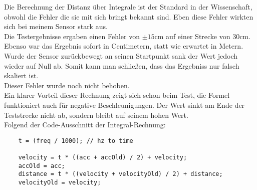 Die Berechnung der Distanz über Integrale ist der Standard 
in der Wissenschaft, obwohl die Fehler die sie mit sich bringt
bekannt sind. Eben diese Fehler wirkten sich bei meinem Sensor
stark aus.\\
Die Testergebnisse ergaben einen Fehler von $\pm15$cm auf einer Strecke
von 30cm. Ebenso war das Ergebnis sofort in Centimetern, statt wie erwartet in Metern. 
Wurde der Sensor zurückbewegt an seinen Startpunkt sank
der Wert jedoch wieder auf Null ab. Somit kann man schließen,
dass das Ergebniss nur falsch skaliert ist.\\
Dieser Fehler wurde noch nicht behoben. \\
Ein klarer Vorteil dieser Rechnung zeigt sich schon beim Test,
die Formel funktioniert auch für negative Beschleunigungen.
Der Wert sinkt am Ende der Teststrecke nicht ab, sondern bleibt
auf seinem hohen Wert.\\
Folgend der Code-Ausschnitt der Integral-Rechnung:
\begin{verbatim}
    t = (freq / 1000); // hz to time

    velocity = t * ((acc + accOld) / 2) + velocity;
    accOld = acc;
    distance = t * ((velocity + velocityOld) / 2) + distance;
    velocityOld = velocity;  
\end{verbatim}